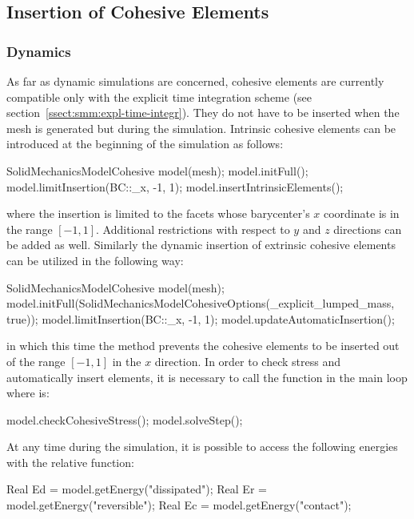 \subsection{Insertion of Cohesive Elements}
\subsubsection{Dynamics}
As far as dynamic simulations are concerned, cohesive elements are
currently compatible only with the explicit time integration scheme
(see section~\ref{ssect:smm:expl-time-integr}). They do not have to be
inserted when the mesh is generated but during the
simulation. Intrinsic cohesive elements can be introduced at the
beginning of the simulation as follows:
\begin{cpp}
  SolidMechanicsModelCohesive model(mesh);
  model.initFull();
  model.limitInsertion(BC::_x, -1, 1);
  model.insertIntrinsicElements();
\end{cpp}
where the insertion is limited to the facets whose barycenter's $x$
coordinate is in the range $[-1,1]$. Additional restrictions with
respect to $y$ and $z$ directions can be added as well. Similarly the
dynamic insertion of extrinsic cohesive elements can be utilized in
the following way:
\begin{cpp}
  SolidMechanicsModelCohesive model(mesh);
  model.initFull(SolidMechanicsModelCohesiveOptions(_explicit_lumped_mass, true));
  model.limitInsertion(BC::_x, -1, 1);
  model.updateAutomaticInsertion();
\end{cpp}
in which this time the method  prevents the
cohesive elements to be inserted out of the range $[-1,1]$ in the $x$
direction. In order to check stress and automatically insert elements,
it is necessary to call the function  in the
main loop where  is:
\begin{cpp}
  model.checkCohesiveStress();
  model.solveStep();
\end{cpp}

At any time during the simulation, it is possible to access the
following energies with the relative function:
\begin{cpp}
  Real Ed = model.getEnergy("dissipated");
  Real Er = model.getEnergy("reversible");
  Real Ec = model.getEnergy("contact");
\end{cpp}

